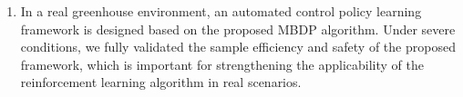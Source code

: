 \begin{abstract*}
\begin{enumerate}
    \item In a real greenhouse environment, an automated control policy learning framework is designed based on the proposed MBDP algorithm. Under severe conditions, we fully validated the sample efficiency and safety of the proposed framework, which is important for strengthening the applicability of the reinforcement learning algorithm in real scenarios.
\end{enumerate}


\end{abstract*}
